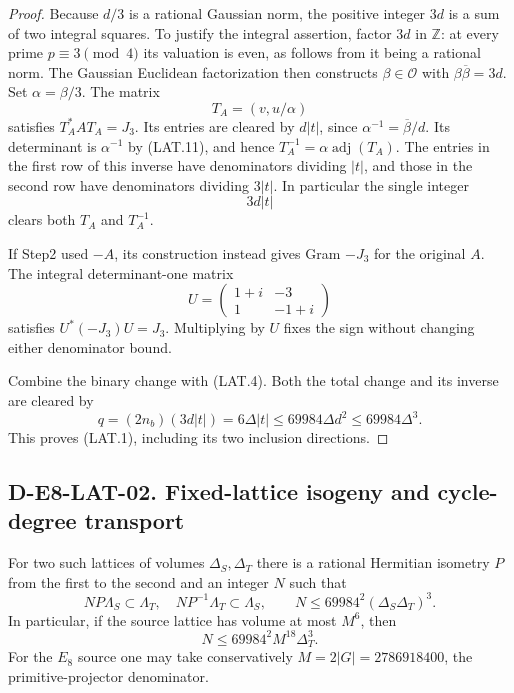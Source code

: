 \begin{proof}
Because $d/3$ is a rational Gaussian norm, the positive integer
$3d$ is a sum of two integral squares.  To justify the integral
assertion, factor $3d$ in $\mathbb Z$: at every prime
$p\equiv3\pmod4$ its valuation is even, as follows from it being
a rational norm.  The Gaussian Euclidean factorization then
constructs $\beta\in\mathcal O$ with
$\beta\overline\beta=3d$.  Set $\alpha=\beta/3$.  The matrix
\[
                  T_A=(v,u/\alpha)
\]
satisfies $T_A^*AT_A=J_3$.  Its entries are cleared by
$d|t|$, since $\alpha^{-1}=\overline\beta/d$.
Its determinant is $\alpha^{-1}$ by (LAT.11), and hence
$T_A^{-1}=\alpha\operatorname{adj}(T_A)$.  The entries in
the first row of this inverse have denominators dividing
$|t|$, and those in the second row have denominators dividing
$3|t|$.  In particular the single integer
\[
                            3d|t|                            \tag{LAT.12}
\]
clears both $T_A$ and $T_A^{-1}$.

If Step2 used $-A$, its construction instead gives Gram
$-J_3$ for the original $A$.  The integral determinant-one
matrix
\[
        U=\begin{pmatrix}1+i&-3\\1&-1+i\end{pmatrix}
\]
satisfies $U^*(-J_3)U=J_3$.  Multiplying by $U$ fixes the
sign without changing either denominator bound.

Combine the binary change with (LAT.4).  Both the total
change and its inverse are cleared by
\[
          q=(2n_b)(3d|t|)=6\Delta|t|
                 \le69984\Delta d^2\le69984\Delta^3.
\]
This proves (LAT.1), including its two inclusion directions.
\end{proof}

\subsection*{D-E8-LAT-02. Fixed-lattice isogeny and cycle-degree transport}

For two such lattices of volumes $\Delta_S,\Delta_T$ there is
a rational Hermitian isometry $P$ from the first to the second
and an integer $N$ such that
\[
 NP\Lambda_S\subset\Lambda_T,\quad
 NP^{-1}\Lambda_T\subset\Lambda_S,\qquad
          N\le69984^2(\Delta_S\Delta_T)^3.                    \tag{LAT.13}
\]
In particular, if the source lattice has volume at most $M^6$,
then
\[
                       N\le69984^2M^{18}\Delta_T^3.           \tag{LAT.14}
\]
For the $E_8$ source one may take conservatively
$M=2|G|=2786918400$, the primitive-projector denominator.

